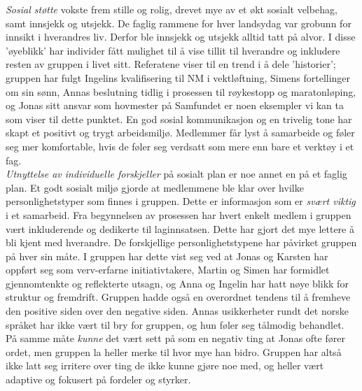 \emph{Sosial støtte} vokste frem stille og rolig, drevet mye av et økt sosialt velbehag, samt innsjekk og utsjekk. 
De faglig rammene for hver landsydag var grobunn for innsikt i hverandres liv. 
Derfor ble innsjekk og utsjekk alltid tatt på alvor. 
I disse 'øyeblikk' har individer fått mulighet til å vise tillit til hverandre og inkludere resten av gruppen i livet sitt. Referatene viser til en trend i å dele 'historier'; gruppen har fulgt Ingelins kvalifisering til NM i vektløftning, Simens fortellinger om sin sønn, Annas beslutning tidlig i prosessen til røykestopp og maratonløping, og Jonas sitt ansvar som hovmester på Samfundet er noen eksempler vi kan ta som viser til dette punktet.
En god sosial kommunikasjon og en trivelig tone har skapt et positivt og trygt arbeidsmiljø\cite{happy}.
Medlemmer får lyst å samarbeide og føler seg mer komfortable, hvis de føler seg verdsatt som mere enn bare et verktøy i et fag.\\

\emph{Utnyttelse av individuelle forskjeller} på sosialt plan er noe annet en på et faglig plan.
Et godt sosialt miljø gjorde at medlemmene ble klar over hvilke personlighetstyper som finnes i gruppen.
Dette er informasjon som er \emph{svært viktig} i et samarbeid.
Fra begynnelsen av prosessen har hvert enkelt medlem i gruppen vært inkluderende og dedikerte til laginnsatsen. 
Dette har gjort det mye lettere å bli kjent med hverandre.
De forskjellige personlighetstypene har påvirket gruppen på hver sin måte.
I gruppen har dette vist seg ved at Jonas og Karsten har oppført seg som verv-erfarne initiativtakere,  Martin og Simen har formidlet gjennomtenkte og reflekterte utsagn, og Anna og Ingelin har hatt nøye blikk for struktur og fremdrift. Gruppen hadde også en overordnet tendens til å fremheve den positive siden over den negative siden. Annas usikkerheter rundt det norske språket har ikke vært til bry for gruppen, og hun føler seg tålmodig behandlet.
På samme måte \emph{kunne} det vært sett på som en negativ ting at Jonas ofte fører ordet, men gruppen la heller merke til hvor mye han bidro.
Gruppen har altså ikke latt seg irritere over ting de ikke kunne gjøre noe med, og heller vært adaptive og fokusert på fordeler og styrker. 